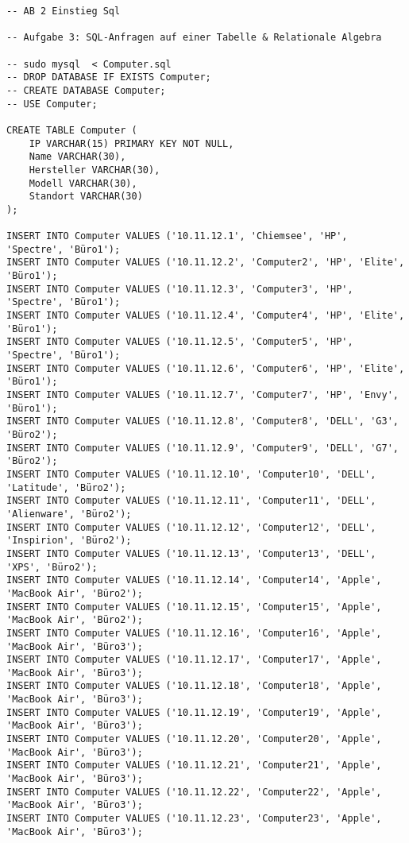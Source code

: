 \documentclass{bschlangaul-aufgabe}
\begin{document}
\begin{verbatim}
-- AB 2 Einstieg Sql

-- Aufgabe 3: SQL-Anfragen auf einer Tabelle & Relationale Algebra

-- sudo mysql  < Computer.sql
-- DROP DATABASE IF EXISTS Computer;
-- CREATE DATABASE Computer;
-- USE Computer;

CREATE TABLE Computer (
    IP VARCHAR(15) PRIMARY KEY NOT NULL,
    Name VARCHAR(30),
    Hersteller VARCHAR(30),
    Modell VARCHAR(30),
    Standort VARCHAR(30)
);

INSERT INTO Computer VALUES ('10.11.12.1', 'Chiemsee', 'HP', 'Spectre', 'Büro1');
INSERT INTO Computer VALUES ('10.11.12.2', 'Computer2', 'HP', 'Elite', 'Büro1');
INSERT INTO Computer VALUES ('10.11.12.3', 'Computer3', 'HP', 'Spectre', 'Büro1');
INSERT INTO Computer VALUES ('10.11.12.4', 'Computer4', 'HP', 'Elite', 'Büro1');
INSERT INTO Computer VALUES ('10.11.12.5', 'Computer5', 'HP', 'Spectre', 'Büro1');
INSERT INTO Computer VALUES ('10.11.12.6', 'Computer6', 'HP', 'Elite', 'Büro1');
INSERT INTO Computer VALUES ('10.11.12.7', 'Computer7', 'HP', 'Envy', 'Büro1');
INSERT INTO Computer VALUES ('10.11.12.8', 'Computer8', 'DELL', 'G3', 'Büro2');
INSERT INTO Computer VALUES ('10.11.12.9', 'Computer9', 'DELL', 'G7', 'Büro2');
INSERT INTO Computer VALUES ('10.11.12.10', 'Computer10', 'DELL', 'Latitude', 'Büro2');
INSERT INTO Computer VALUES ('10.11.12.11', 'Computer11', 'DELL', 'Alienware', 'Büro2');
INSERT INTO Computer VALUES ('10.11.12.12', 'Computer12', 'DELL', 'Inspirion', 'Büro2');
INSERT INTO Computer VALUES ('10.11.12.13', 'Computer13', 'DELL', 'XPS', 'Büro2');
INSERT INTO Computer VALUES ('10.11.12.14', 'Computer14', 'Apple', 'MacBook Air', 'Büro2');
INSERT INTO Computer VALUES ('10.11.12.15', 'Computer15', 'Apple', 'MacBook Air', 'Büro2');
INSERT INTO Computer VALUES ('10.11.12.16', 'Computer16', 'Apple', 'MacBook Air', 'Büro3');
INSERT INTO Computer VALUES ('10.11.12.17', 'Computer17', 'Apple', 'MacBook Air', 'Büro3');
INSERT INTO Computer VALUES ('10.11.12.18', 'Computer18', 'Apple', 'MacBook Air', 'Büro3');
INSERT INTO Computer VALUES ('10.11.12.19', 'Computer19', 'Apple', 'MacBook Air', 'Büro3');
INSERT INTO Computer VALUES ('10.11.12.20', 'Computer20', 'Apple', 'MacBook Air', 'Büro3');
INSERT INTO Computer VALUES ('10.11.12.21', 'Computer21', 'Apple', 'MacBook Air', 'Büro3');
INSERT INTO Computer VALUES ('10.11.12.22', 'Computer22', 'Apple', 'MacBook Air', 'Büro3');
INSERT INTO Computer VALUES ('10.11.12.23', 'Computer23', 'Apple', 'MacBook Air', 'Büro3');
\end{verbatim}
\end{document}
